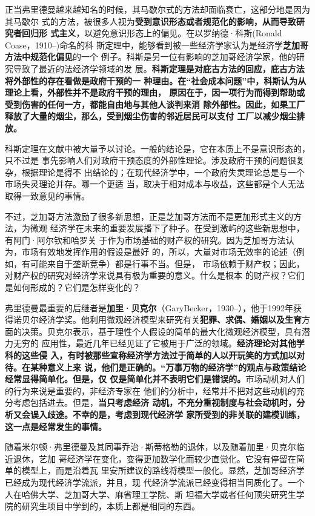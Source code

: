 正当弗里德曼越来越知名的时候，其马歇尔式的方法却面临衰亡，这部分地是因为其马歇尔
式的方法，被很多人视为\textbf{受到意识形态或者规范化的影响，从而导致研究者回归形
  式主义}，以避免意识形态上的偏见。在以罗纳德·科斯(Ronald Coase，1910--)命名的科
斯定理中，能够看到被一些经济学家认为是经济学\textbf{芝加哥方法中规范化偏见}的一个
例子。科斯是另一位有影响的芝加哥经济学家，他的研究导致了最近的法经济学领域的发
展。\textbf{科斯定理是对庇古方法的回应，庇古方法将外部性的存在看做是政府干预的一
  种理由。在“社会成本问题”中，科斯认为从理论上看，外部性并不是政府干预的理由，
  原因在于，因一项行为而得到帮助或受到伤害的任何一方，都能自由地与其他人谈判来消
  除外部性。因此，如果工厂释放了大量的烟尘，那么，受到烟尘伤害的邻近居民可以支付
  工厂以减少烟尘排放。}

科斯定理在文献中被大量予以讨论。一般的结论是，它在本质上不是意识形态的，只不过是
事先影响人们对政府干预态度的外部性理论。涉及政府干预的问题很复杂，根据理论是得不
出结论的；在现代经济学中，一个政府失灵理论总是与一个市场失灵理论并存。哪一个更适
当，取决于相对成本与收益，这些都是个人无法取得一致意见的事情。

不过，芝加哥方法激励了很多新思想，正是芝加哥方法而不是更加形式主义的方法，为微观
经济学在未来的重要发展播下了种子。在受到激屿的这些新思想中，有阿门·阿尔钦和哈罗关
于作为市场基础的财产权的研究。因为芝加哥方法认为，市场有效地发挥作用的假设是最好
的，所以，大量对市场无效率的论述（例如，有可能来自于垄断竞争）都是行事不当。但是，
市场依赖于财产权；因此，对财产权的研究对经济学来说具有极为重要的意义。什么是根本
的财产权？它们是如何形成的？它们是怎样变化的？

弗里德曼最重要的后继者是\textbf{加里·贝克尔}（GaryBecker，1930--），他于1992年获
得诺贝尔经济学奖。他利用微观经济模型来研究有关\textbf{犯罪、求偶、婚姻以及生育}方
面的决策。贝克尔表示，基于理性个人假设的简单的最大化微观经济模型，具有潜力无穷的
应用性，最近几年已经见证了它被用于广泛的领域。\textbf{经济理论对其他学科的这些侵
  入，有时被那些宣称经济学方法过于简单的人以开玩笑的方式加以对待。在某种意义上来
  说，他们是正确的。“万事万物的经济学”的观点与政策结论经常显得简单化。但是，仅
  仅是简单化并不表明它们是错误的。}市场动机对人们的行为来说是重要的，非经济专家在
他们的分析中，经常并不把对这些动机的充分考虑包括进去。但是，\textbf{当只考虑经济
  动机，不充分重视制度与社会动机时，分析又会误入歧途。不幸的是，考虑到现代经济学
  家所受到的非关联的建模训练，这一点是经常发生的事情。}

随着米尔顿·弗里德曼及其同事乔治·斯蒂格勒的退休，以及随着加里·贝克尔临近退休，艺加
哥经济学在变化，变得更加数学化而较少直觉化。它没有停留在简单的模型上，而是沿着瓦
里安所建议的路线将模型一般化。显然，芝加哥经济学已经成为现代经济学流派，并且，现
代经济学流派已经变得相当同质化了。一个人在哈佛大学、芝加哥大学、麻省理工学院、斯
坦福大学或者任何顶尖研究生学院的研究生项目中学到的，本质上都是相同的东西。

